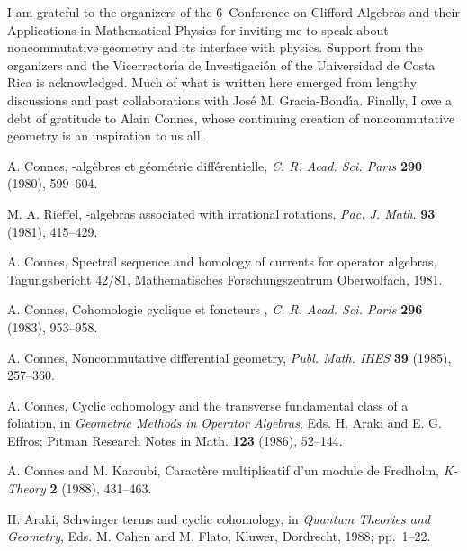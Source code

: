 \documentclass[a4paper,12pt]{article}
\providecommand{\1}{\mathbf{1}}         %
\providecommand{\7}{\dagger}            %
\providecommand{\8}{\bullet}            %
\renewcommand{\.}{\cdot}            %
\renewcommand{\:}{\colon}           %
\begin{document}
I am grateful to the organizers of the 6\coordHE{}~Conference on
Clifford Algebras and their Applications in Mathematical Physics for
inviting me to speak about noncommutative geometry and its interface
with physics. Support from the organizers and the Vicerrector\'{\i}a
de Investigaci\'on of the Universidad de Costa Rica is acknowledged.
Much of what is written here emerged from lengthy discussions and past
collaborations with Jos\'e M. Gracia-Bond\'{\i}a. Finally, I owe a
debt of gratitude to Alain Connes, whose continuing creation of
noncommutative geometry is an inspiration to us all.



\begin{thebibliography}{74}

\def\topsep{0pt}
\def\parsep{0pt plus 5pt minus 1pt}
\def\itemsep{-0.5ex}
\small

A. Connes,
\coordHE{}-alg\`ebres et g\'eom\'etrie diff\'erentielle,
\textit{C. R. Acad. Sci. Paris} {\bf 290} (1980), 599--604.

M. A. Rieffel,
\coordHE{}-algebras associated with irrational rotations,
\textit{Pac. J. Math}. {\bf 93} (1981), 415--429.

A. Connes,
Spectral sequence and homology of currents for operator algebras,
Tagungsbericht 42/81,
Mathematisches Forschungszentrum Oberwolfach, 1981.

A. Connes,
Cohomologie cyclique et foncteurs \coordHE{},
\textit{C. R. Acad. Sci. Paris} {\bf 296} (1983), 953--958.

A. Connes,
Noncommutative differential geometry,
\textit{Publ. Math. IHES} {\bf 39} (1985), 257--360.

A. Connes,
Cyclic cohomology and the transverse fundamental class of a
foliation,
in \textit{Geometric Methods in Operator Algebras},
Eds. H. Araki and E. G. Effros;
Pitman Research Notes in Math. {\bf 123} (1986), 52--144.

A. Connes and M. Karoubi,
Caract\`ere multiplicatif d'un module de Fredholm,
\textit{K-Theory} {\bf 2} (1988), 431--463.

H. Araki,
Schwinger terms and cyclic cohomology,
in \textit{Quantum Theories and Geometry},
Eds. M. Cahen and M. Flato,
Kluwer, Dordrecht, 1988; pp.~1--22.


\end{thebibliography}
\end{document}
